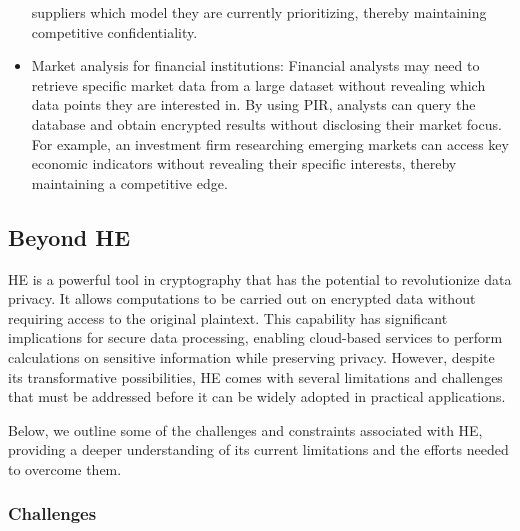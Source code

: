 \documentclass[
  letterpaper,
  DIV=11,
  numbers=noendperiod,
  oneside]{scrartcl}
\begin{document}
\begin{itemize}
  suppliers which model they are currently prioritizing, thereby
  maintaining competitive confidentiality.
\item
  Market analysis for financial institutions: Financial analysts may
  need to retrieve specific market data from a large dataset without
  revealing which data points they are interested in. By using PIR,
  analysts can query the database and obtain encrypted results without
  disclosing their market focus. For example, an investment firm
  researching emerging markets can access key economic indicators
  without revealing their specific interests, thereby maintaining a
  competitive edge.
\end{itemize}

\subsection{Beyond HE}\label{beyond-he}

HE is a powerful tool in cryptography that has the potential to
revolutionize data privacy. It allows computations to be carried out on
encrypted data without requiring access to the original plaintext. This
capability has significant implications for secure data processing,
enabling cloud-based services to perform calculations on sensitive
information while preserving privacy. However, despite its
transformative possibilities, HE comes with several limitations and
challenges that must be addressed before it can be widely adopted in
practical applications.

Below, we outline some of the challenges and constraints associated with
HE, providing a deeper understanding of its current limitations and the
efforts needed to overcome them.

\subsubsection{Challenges}\label{challenges}
\end{document}
